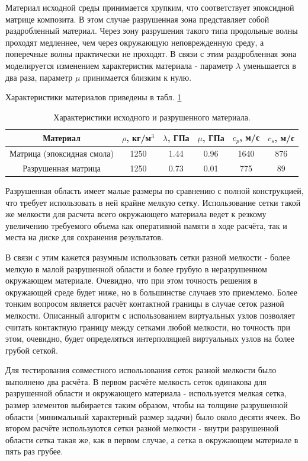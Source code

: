 Материал исходной среды принимается хрупким, что соответствует эпоксидной матрице композита. В этом случае разрушенная зона представляет собой раздробленный материал. Через зону разрушения такого типа продольные волны проходят медленнее, чем через окружающую неповрежденную среду, а поперечные волны практически не проходят. В связи с этим раздробленная зона моделируется изменением характеристик материала - параметр $\lambda$ уменьшается в два раза, параметр $\mu$ принимается близким к нулю. 

Характеристики материалов приведены в табл. \ref{tbl:crack}
\begin{table}[h]
\centering
\begin{tabular}{|c|c|c|c|c|c|}
\hline
Материал & $\rho$, кг/м$^{3}$ & $\lambda$, ГПа & $\mu$, ГПа &
$c_p$, м/с & $c_s$, м/с \\
\hline
Матрица (эпоксидная смола) & 1250 & 1.44 & 0.96 & 1640 & 876 \\
Разрушенная матрица & 1250 & 0.73 & 0.01 & 775 & 89 \\
\hline
\end{tabular}
\caption{Характеристики исходного и разрушенного материала.}
\label{tbl:crack}
\end{table}

Разрушенная область имеет малые размеры по сравнению с полной конструкцией, что требует использовать в ней крайне мелкую сетку. Использование сетки такой же мелкости для расчета всего окружающего материала ведет к резкому увеличению требуемого объема как оперативной памяти в ходе расчёта, так и места на диске для сохранения результатов.

В связи с этим кажется разумным использовать сетки разной мелкости - более мелкую в малой разрушенной области и более грубую в неразрушенном окружающем материале. Очевидно, что при этом точность решения в окружающей среде будет ниже, но в большинстве случаев это приемлемо. Более тонким вопросом является расчёт контактной границы в случае сеток разной мелкости. Описанный алгоритм с использованием виртуальных узлов позволяет считать контактную границу между сетками любой мелкости, но точность при этом, очевидно, будет определяться интерполяцией виртуальных узлов на более грубой сеткой.

Для тестирования совместного использования сеток разной мелкости было выполнено два расчёта. В первом расчёте мелкость сеток одинакова для разрушенной области и окружающего материала - используется мелкая сетка, размер элементов выбирается таким образом, чтобы на толщине разрушенной области (минимальный характерный размер задачи) было около десяти ячеек. Во втором расчёте используются сетки разной мелкости - внутри разрушенной области сетка такая же, как в первом случае, а сетка в окружающем материале в пять раз грубее.

